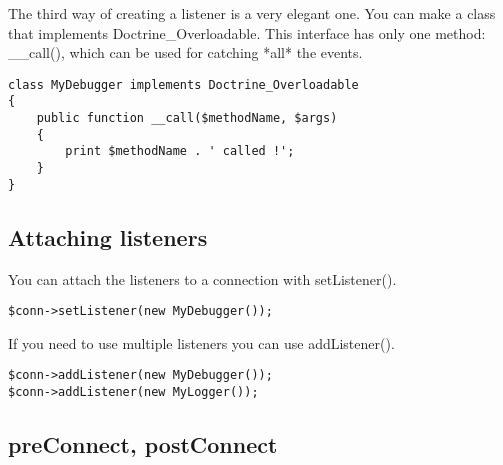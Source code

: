 \documentclass[11pt,a4paper]{report}
\begin{document}
The third way of creating a listener is a very elegant one. You can make a class that implements Doctrine\_Overloadable. This interface has only one method: \_\_call(), which can be used for catching *all* the events.

\begin{verbatim}
class MyDebugger implements Doctrine_Overloadable
{
    public function __call($methodName, $args)
    {
        print $methodName . ' called !';
    }
}
\end{verbatim}

\subsection{Attaching listeners}
You can attach the listeners to a connection with setListener().

\begin{verbatim}
$conn->setListener(new MyDebugger());
\end{verbatim}

If you need to use multiple listeners you can use addListener().

\begin{verbatim}
$conn->addListener(new MyDebugger());
$conn->addListener(new MyLogger());
\end{verbatim}

\subsection{preConnect, postConnect}
\end{document}
